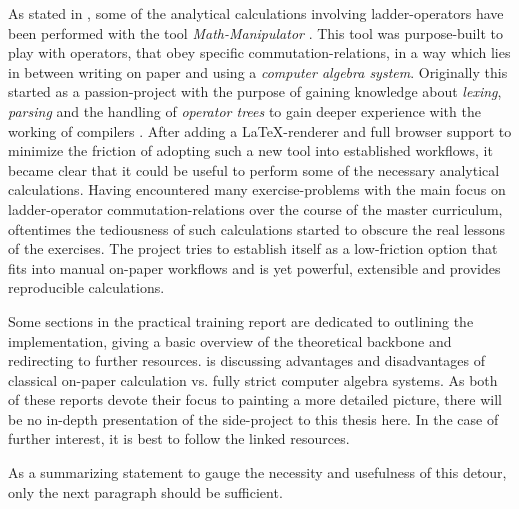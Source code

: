As stated in , some of the analytical calculations involving ladder-operators have been performed with the tool \emph{Math-Manipulator} \cite{selfMathManipulator}.
This tool was purpose-built to play with operators, that obey specific commutation-relations, in a way which lies in between writing on paper and using a \emph{computer algebra system}.
Originally this started as a passion-project with the purpose of gaining knowledge about \emph{lexing}, \emph{parsing} and the handling of \emph{operator trees} to gain deeper experience with the working of compilers \cite{compilersDragonBook}.
After adding a \LaTeX-renderer and full browser support to minimize the friction of adopting such a new tool into established workflows, it became clear that it could be useful to perform some of the necessary analytical calculations.
Having encountered many exercise-problems with the main focus on ladder-operator commutation-relations over the course of the master curriculum, oftentimes the tediousness of such calculations started to obscure the real lessons of the exercises.
The project tries to establish itself as a low-friction option that fits into manual \glqq on-paper\grqq{} workflows and is yet powerful, extensible and provides reproducible calculations.

Some sections in the practical training report  are dedicated to outlining the implementation, giving a basic overview of the theoretical backbone and redirecting to further resources.
 is discussing advantages and disadvantages of classical \glqq on-paper\grqq{} calculation vs. fully strict computer algebra systems.
As both of these reports devote their focus to painting a more detailed picture, there will be no in-depth presentation of the side-project to this thesis here.
In the case of further interest, it is best to follow the linked resources.

As a summarizing statement to gauge the necessity and usefulness of this detour, only the next paragraph should be sufficient.

